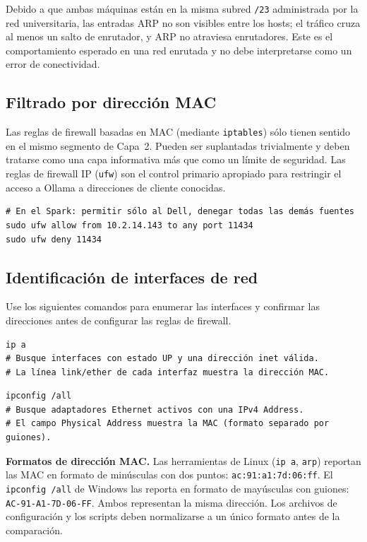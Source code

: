 Debido a que ambas máquinas están en la misma subred \texttt{/23}
administrada por la red universitaria, las entradas ARP no son visibles
entre los hosts; el tráfico cruza al menos un salto de enrutador, y ARP no
atraviesa enrutadores. Este es el comportamiento esperado en una red
enrutada y no debe interpretarse como un error de conectividad.

\subsection{Filtrado por dirección MAC}

Las reglas de firewall basadas en MAC (mediante \texttt{iptables}) sólo
tienen sentido en el mismo segmento de Capa~2. Pueden ser suplantadas
trivialmente y deben tratarse como una capa informativa más que como un
límite de seguridad. Las reglas de firewall IP (\texttt{ufw}) son el
control primario apropiado para restringir el acceso a Ollama a
direcciones de cliente conocidas.

\begin{lstlisting}[style=bashstyle, caption={Restringir Ollama solamente a la IP del Dell}]
# En el Spark: permitir sólo al Dell, denegar todas las demás fuentes
sudo ufw allow from 10.2.14.143 to any port 11434
sudo ufw deny 11434
\end{lstlisting}

\subsection{Identificación de interfaces de red}

Use los siguientes comandos para enumerar las interfaces y confirmar las
direcciones antes de configurar las reglas de firewall.

\begin{lstlisting}[style=bashstyle, caption={Linux: listar interfaces y direcciones}]
ip a
# Busque interfaces con estado UP y una dirección inet válida.
# La línea link/ether de cada interfaz muestra la dirección MAC.
\end{lstlisting}

\begin{lstlisting}[style=psstyle, caption={Windows: listar interfaces y direcciones}]
ipconfig /all
# Busque adaptadores Ethernet activos con una IPv4 Address.
# El campo Physical Address muestra la MAC (formato separado por guiones).
\end{lstlisting}

\begin{infobox}
\textbf{Formatos de dirección MAC.} Las herramientas de Linux (\texttt{ip~a},
\texttt{arp}) reportan las MAC en formato de minúsculas con dos puntos:
\texttt{ac:91:a1:7d:06:ff}. El \texttt{ipconfig~{/}all} de Windows las
reporta en formato de mayúsculas con guiones: \texttt{AC-91-A1-7D-06-FF}.
Ambos representan la misma dirección. Los archivos de configuración y los
scripts deben normalizarse a un único formato antes de la comparación.
\end{infobox}

